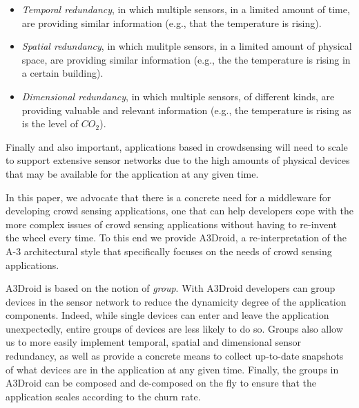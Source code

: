 \begin{itemize}

\item \emph{Temporal redundancy}, in which multiple sensors, in a limited amount of time, are providing similar information  (e.g., that the temperature is rising). 

\item \emph{Spatial redundancy}, in which mulitple sensors, in a limited amount of physical space, are providing similar information (e.g., the the temperature is rising in a certain building). 

\item \emph{Dimensional redundancy}, in which multiple sensors, of different kinds, are providing valuable and relevant information (e.g., the temperature is rising as is the level of $CO_{2}$). 

\end{itemize}

Finally and also important, applications based in crowdsensing will need to scale to support extensive sensor networks due to the high amounts of physical devices that may be available for the application at any given time.

In this paper, we advocate that there is a concrete need for a middleware for developing crowd sensing applications, one that can help developers cope with the more complex issues of crowd sensing applications without having to re-invent the wheel every time. To this end we provide A3Droid, a re-interpretation of the A-3 architectural style that specifically focuses on the needs of crowd sensing applications. 

A3Droid is based on the notion of \emph{group}. With A3Droid developers can group devices in the sensor network to reduce the dynamicity degree of the application components. Indeed, while single devices can enter and leave the application unexpectedly, entire groups of devices are less likely to do so. Groups also allow us to more easily implement temporal, spatial and dimensional sensor redundancy, as well as provide a concrete means to collect up-to-date snapshots of what devices are in the application at any given time. Finally, the groups in A3Droid can be composed and de-composed on the fly to ensure that the application scales according to the churn rate. 

